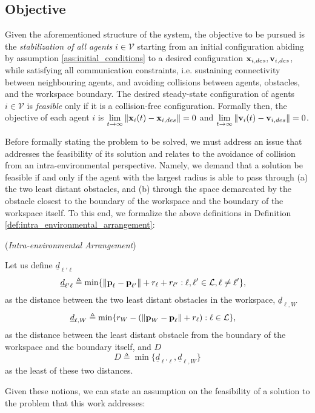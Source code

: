 \subsection{Objective}

Given the aforementioned structure of the system, the objective to be
pursued is the \textit{stabilization of all agents} $i \in \mathcal{V}$ starting
from an initial configuration abiding by assumption
\eqref{ass:initial_conditions} to a desired configuration
$\bm{\mathbf{x}}_{i,des}, \bm{\mathbf{v}}_{i,des}$, while
satisfying all communication constraints, i.e. sustaining connectivity between
neighbouring agents, and avoiding collisions between agents, obstacles, and the
workspace boundary. The desired steady-state configuration of agents
$i \in \mathcal{V}$ is \textit{feasible} only if it is a
collision-free configuration. Formally then, the objective of each agent $i$ is
$\lim\limits_{t \to \infty} \|\bm{\mathbf{x}}_i(t) - \bm{\mathbf{x}}_{i,des}\| = 0$ and
$\lim\limits_{t \to \infty} \|\bm{\mathbf{v}}_i(t) - \bm{\mathbf{v}}_{i,des}\| = 0$.

Before formally stating the problem to be solved, we must address an issue
that addresses the feasibility of its solution and relates to the avoidance of
collision from an intra-environmental perspective. Namely, we demand that a
solution be feasible if and only if the agent with the largest radius is able to
pass through (a) the two least distant obstacles, and (b) through the space
demarcated by the obstacle closest to the boundary of the workspace and the
boundary of the workspace itself. To this end, we formalize the above
definitions in Definition \eqref{def:intra_environmental_arrangement}:

\begin{bw_box}
\begin{definition} (\textit{Intra-environmental Arrangement})

  Let us define $\underline{d}_{\ell'\ell}$
  \begin{align*}
    \underline{d}_{\ell'\ell} &\triangleq \min\{\| \bm{\mathbf{p}}_{\ell} - \bm{\mathbf{p}}_{\ell'}\| + r_{\ell} + r_{\ell'} :
      \ell,\ell' \in \mathcal{L}, \ell \neq \ell' \},
  \end{align*}
  as the distance between the two least distant obstacles in the workspace,
  $\underline{d}_{\ell,W}$
  \begin{align*}
    \underline{d}_{\ell,W} & \triangleq \min\{r_W - (\|\bm{\mathbf{p}}_W - \bm{\mathbf{p}}_{\ell}\| + r_{\ell}) : \ell \in \mathcal{L}\},
  \end{align*}
  as the distance between the least distant obstacle from the boundary of the
  workspace and the boundary itself, and $D$
  \begin{equation*}
    D \triangleq \min\{\underline{d}_{\ell'\ell}, \underline{d}_{\ell,W}\}
  \end{equation*}
  as the least of these two distances.
\label{def:intra_environmental_arrangement}
\end{definition}
\end{bw_box}
Given these notions, we can state an assumption on the feasibility of a
solution to the problem that this work addresses:

